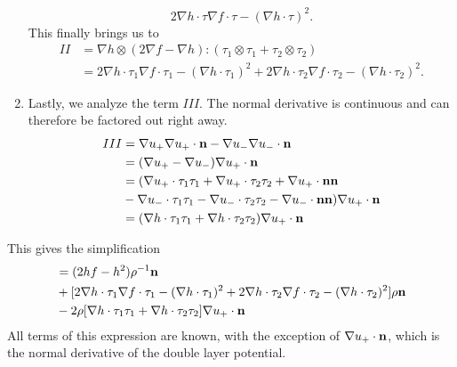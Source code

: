 \documentclass[preprint,11pt]{article}
\begin{document}
\begin{enumerate}
\begin{equation}
2\nabla h \cdot \tau \nabla f \cdot \tau - (\nabla h \cdot \tau)^2.
\end{equation}
This finally brings us to
\begin{align*}
II 
&= \nabla h \otimes(2\nabla f - \nabla h): (\tau_1 \otimes \tau_1 + \tau_2 \otimes \tau_2)\\
&= 2\nabla h \cdot \tau_1 \nabla f \cdot \tau_1 -  (\nabla h \cdot \tau_1)^2 
+ 2\nabla h \cdot \tau_2 \nabla f \cdot \tau_2 -  (\nabla h \cdot \tau_2)^2.
\end{align*}
\item Lastly, we analyze the term $III$. The normal derivative is continuous and can therefore 
be factored out right away. 
\begin{align*}
III  
&= \nabla u_+ \nabla u_+ \cdot {\bf n} - \nabla u_- \nabla u_- \cdot {\bf n}\\
&= (\nabla u_+ - \nabla u_-) \nabla u_+ \cdot {\bf n}\\
&= (\nabla u_+\cdot \tau_1 \tau_1 + \nabla u_+\cdot \tau_2 \tau_2 + \nabla u_+\cdot {\bf n}{\bf n}\\
& -\nabla u_-\cdot \tau_1 \tau_1 - \nabla u_-\cdot \tau_2 \tau_2 - \nabla u_-\cdot {\bf n}{\bf n}) \nabla u_+ \cdot {\bf n}\\
&= (\nabla h \cdot \tau_1 \tau_1 + \nabla h \cdot \tau_2 \tau_2) \nabla u_+ \cdot {\bf n}
\end{align*}
\end{enumerate}
This gives the simplification
\begin{align*}
[{\bf T}_+  - {\bf T}_- ]
&= (2hf - h^2)\rho^{-1}{\bf n}\\ 
&+ 
[2\nabla h \cdot \tau_1 \nabla f \cdot \tau_1 -  (\nabla h \cdot \tau_1)^2 
+ 2\nabla h \cdot \tau_2 \nabla f \cdot \tau_2 -  (\nabla h \cdot \tau_2)^2]\rho {\bf n}\\
&-2\rho[\nabla h \cdot \tau_1 \tau_1 + \nabla h \cdot \tau_2 \tau_2] \nabla u_+ \cdot {\bf n}
\end{align*}
All terms of this expression are known, with the exception of $\nabla u_+ \cdot {\bf n}$, which is the normal derivative 
of the double layer potential. 
\end{document}
